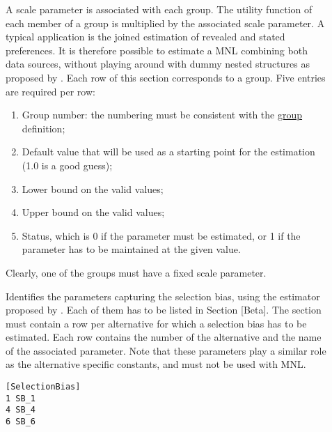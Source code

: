 \documentclass[12pt]{memoir}
\begin{document}
\begin{description}
   \item[] A scale parameter is associated with each group. The
      utility function of each member of a group is multiplied by the associated
      scale parameter. A typical application is the joined estimation of revealed
      and stated preferences. It is therefore possible to estimate a MNL combining
      both data sources, without playing around with dummy nested structures as
      proposed by . Each row of this section corresponds to a
      group. Five entries are required per row:
      \begin{enumerate}
         \item Group number: the numbering must be consistent with the
            \hyperlink{Group}{group} definition;
         \item Default value that will be used as a starting point for the estimation
            (1.0 is a good guess);
         \item Lower bound on the valid values;
         \item Upper bound on the valid values;
         \item Status, which is 0 if the parameter must be estimated, or 1 if the parameter has to be maintained at the given value. 
      \end{enumerate}
      Clearly, one of the groups must have a fixed scale parameter. 

     \item[] Identifies the parameters
       capturing the selection bias, using the estimator proposed by . Each of them has to  be listed in
         Section [Beta]. The section must contain a
         row per alternative for which a selection bias has to be
         estimated. Each row contains the number of the alternative
         and the name of the associated parameter. Note that these parameters play a similar role as the alternative specific constants, and must not be used with MNL. 
{\footnotesize
\begin{verbatim}
[SelectionBias]
1 SB_1
4 SB_4
6 SB_6
\end{verbatim}
}
         

\end{description}
\end{document}
